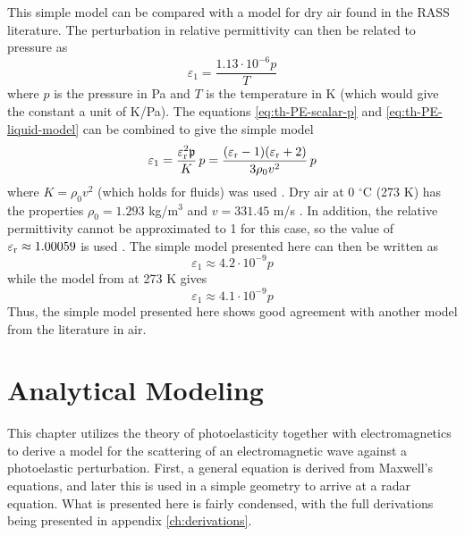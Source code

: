 \documentclass[11pt,twoside]{eitExjobb}
\begin{document}
	This simple model can be compared with a model for dry air found in the RASS literature. The perturbation in relative permittivity can then be related to pressure as \cite{Rapoport1997}
	\begin{equation*}
		\varepsilon_1 = \frac{1.13 \cdot 10^{-6} p}{T}
	\end{equation*}
	where $p$ is the pressure in Pa and $T$ is the temperature in K (which would give the constant a unit of K/Pa). The equations \eqref{eq:th-PE-scalar-p} and \eqref{eq:th-PE-liquid-model} can be combined to give the simple model
	\begin{equation*}
		\varepsilon_1 = \frac{\varepsilon_{\mathrm{r}}^2 \mathfrak{p}}{K} \,p = \frac{(\varepsilon_{\mathrm{r}} - 1)(\varepsilon_{\mathrm{r}} + 2)}{3\rho_0 v^2} \,p
	\end{equation*}
	where $K = \rho_0 v^2$ (which holds for fluids) was used \cite{Schmerr2016}. Dry air at 0 $^\circ$C (273 K) has the properties $\rho_0 = 1.293$ kg/m$^3$ and $v = 331.45$ m/s \cite{Onda2003}. In addition, the relative permittivity cannot be approximated to 1 for this case, so the value of $\varepsilon_{\mathrm{r}} \approx 1.00059$ is used \cite{Hector1936}. The simple model presented here can then be written as
	\begin{equation*}
		\varepsilon_1 \approx 4.2 \cdot 10^{-9} p
	\end{equation*}
	while the model from \cite{Rapoport1997} at 273 K gives
	\begin{equation*}
		\varepsilon_1 \approx 4.1 \cdot 10^{-9} p
	\end{equation*}
	Thus, the simple model presented here shows good agreement with another model from the literature in air.
	
	\chapter{Analytical Modeling \label{ch:analytical}}
	This chapter utilizes the theory of photoelasticity together with electromagnetics to derive a model for the scattering of an electromagnetic wave against a photoelastic perturbation. First, a general equation is derived from Maxwell's equations, and later this is used in a simple geometry to arrive at a radar equation. What is presented here is fairly condensed, with the full derivations being presented in appendix \ref{ch:derivations}.
	
\end{document}
